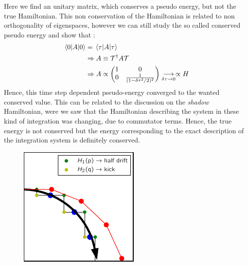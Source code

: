 \documentclass[ansiapaper]{report}
\begin{document}
\begin{multicols}{3}
	Here we find an unitary matrix, which conserves a pseudo energy, but not the true Hamiltonian. This non conservation of the Hamiltonian is related to non orthogonality of eigenspaces, however we can still study the so called conserved pseudo energy and show that :
	\begin{align*}
		\expval{A}{0} & = \expval{A}{\tau}
		\\ & \Rightarrow A \equiv \mathcal{T}^\dagger A \mathcal{T}
		\\ & \Rightarrow A \propto \begin{pmatrix}
			1 & 0                                 \\
			0 & \frac{1}{(1 - \delta \tau^2/2)^2}
		\end{pmatrix}\underset{\delta \tau \rightarrow 0}{\longrightarrow} \propto H
	\end{align*}
	Hence, this time step dependent pseudo-energy converged to the wanted conserved value. This can be related to the discussion on the \textit{shadow} Hamiltonian, were we saw that the Hamiltonian describing the system in these kind of integration was changing, due to commutator terms. Hence, the true energy is not conserved but the energy corresponding to the exact description of the integration system is definitely conserved.
	\begin{figure}[H]
		\centering
		\includegraphics[width=1\linewidth]{./figures/Velvet_euler.pdf}

\end{figure}
\end{multicols}
\end{document}
